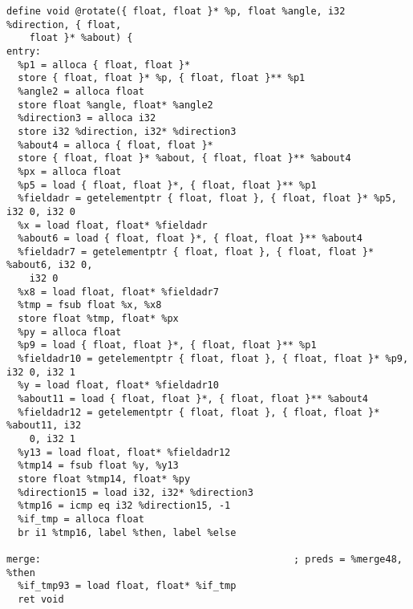 \documentclass[main.tex]{subfiles}
\begin{document}
{\begin{lstlisting}
define void @rotate({ float, float }* %p, float %angle, i32 %direction, { float,
    float }* %about) {
entry:
  %p1 = alloca { float, float }*
  store { float, float }* %p, { float, float }** %p1
  %angle2 = alloca float
  store float %angle, float* %angle2
  %direction3 = alloca i32
  store i32 %direction, i32* %direction3
  %about4 = alloca { float, float }*
  store { float, float }* %about, { float, float }** %about4
  %px = alloca float
  %p5 = load { float, float }*, { float, float }** %p1
  %fieldadr = getelementptr { float, float }, { float, float }* %p5, i32 0, i32 0
  %x = load float, float* %fieldadr
  %about6 = load { float, float }*, { float, float }** %about4
  %fieldadr7 = getelementptr { float, float }, { float, float }* %about6, i32 0, 
    i32 0
  %x8 = load float, float* %fieldadr7
  %tmp = fsub float %x, %x8
  store float %tmp, float* %px
  %py = alloca float
  %p9 = load { float, float }*, { float, float }** %p1
  %fieldadr10 = getelementptr { float, float }, { float, float }* %p9, i32 0, i32 1
  %y = load float, float* %fieldadr10
  %about11 = load { float, float }*, { float, float }** %about4
  %fieldadr12 = getelementptr { float, float }, { float, float }* %about11, i32
    0, i32 1
  %y13 = load float, float* %fieldadr12
  %tmp14 = fsub float %y, %y13
  store float %tmp14, float* %py
  %direction15 = load i32, i32* %direction3
  %tmp16 = icmp eq i32 %direction15, -1
  %if_tmp = alloca float
  br i1 %tmp16, label %then, label %else

merge:                                            ; preds = %merge48, %then
  %if_tmp93 = load float, float* %if_tmp
  ret void


\end{lstlisting}}
\end{document}
